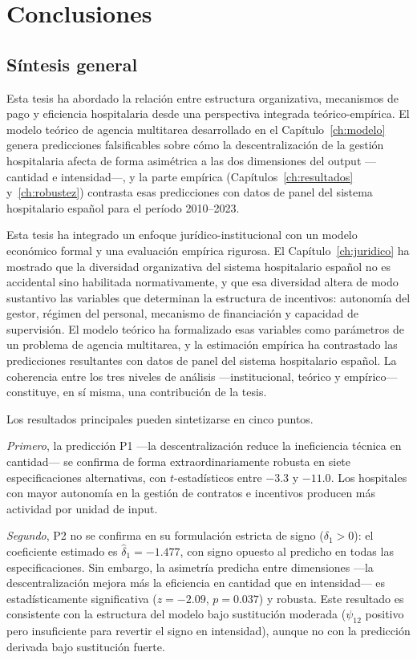 ﻿\chapter{Conclusiones}
\label{ch:conclusiones}

\section{Síntesis general}

Esta tesis ha abordado la relación entre estructura organizativa, mecanismos de pago y eficiencia hospitalaria desde una perspectiva integrada teórico-empírica. El modelo teórico de agencia multitarea desarrollado en el Capítulo~\ref{ch:modelo} genera predicciones falsificables sobre cómo la descentralización de la gestión hospitalaria afecta de forma asimétrica a las dos dimensiones del output ---cantidad e intensidad---, y la parte empírica (Capítulos~\ref{ch:resultados} y~\ref{ch:robustez}) contrasta esas predicciones con datos de panel del sistema hospitalario español para el período 2010--2023.

Esta tesis ha integrado un enfoque jurídico-institucional con un modelo económico formal y una evaluación empírica rigurosa. El Capítulo~\ref{ch:juridico} ha mostrado que la diversidad organizativa del sistema hospitalario español no es accidental sino habilitada normativamente, y que esa diversidad altera de modo sustantivo las variables que determinan la estructura de incentivos: autonomía del gestor, régimen del personal, mecanismo de financiación y capacidad de supervisión. El modelo teórico ha formalizado esas variables como parámetros de un problema de agencia multitarea, y la estimación empírica ha contrastado las predicciones resultantes con datos de panel del sistema hospitalario español. La coherencia entre los tres niveles de análisis ---institucional, teórico y empírico--- constituye, en sí misma, una contribución de la tesis.

Los resultados principales pueden sintetizarse en cinco puntos.

\textit{Primero}, la predicción P1 ---la descentralización reduce la ineficiencia técnica en cantidad--- se confirma de forma extraordinariamente robusta en siete especificaciones alternativas, con $t$-estadísticos entre $-3.3$ y $-11.0$. Los hospitales con mayor autonomía en la gestión de contratos e incentivos producen más actividad por unidad de input.

\textit{Segundo}, P2 no se confirma en su formulación estricta de signo ($\delta_1 > 0$): el coeficiente estimado es $\hat{\delta}_1 = -1.477$, con signo opuesto al predicho en todas las especificaciones. Sin embargo, la asimetría predicha entre dimensiones ---la descentralización mejora más la eficiencia en cantidad que en intensidad--- es estadísticamente significativa ($z = -2.09$, $p = 0.037$) y robusta. Este resultado es consistente con la estructura del modelo bajo sustitución moderada ($\psi_{12}$ positivo pero insuficiente para revertir el signo en intensidad), aunque no con la predicción derivada bajo sustitución fuerte.

